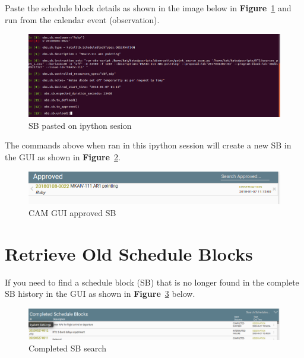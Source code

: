 	
Paste the schedule block details as shown in the image below in \textbf{Figure}~\ref{fig:image3} and run from the calendar event (observation).


\begin{figure}[!thb]
	\centering
	\includegraphics[scale=0.35]{Chapters/images/image3.png}
	
	\caption{SB pasted on ipython sesion}
	\label{fig:image3}
\end{figure}
The commands above when ran in this ipython session will create a new SB in the GUI as shown in \textbf{Figure}~\ref{fig:image6}.

\begin{figure}[!thb]
	\centering
	\includegraphics[scale=0.8]{Chapters/images/image6.png}
	
	\caption{CAM GUI approved SB }
	\label{fig:image6}
\end{figure}

\section{Retrieve Old Schedule Blocks}
If you need to find a schedule block (SB) that is no longer found in the complete SB history in the GUI as shown in \textbf{Figure}~\ref{fig:image44} below. 

\begin{figure}[!thb]
	\centering
	\includegraphics[scale=0.35]{Chapters/images/image44.png}
	
	\caption{Completed SB search}
	\label{fig:image44}
\end{figure}

